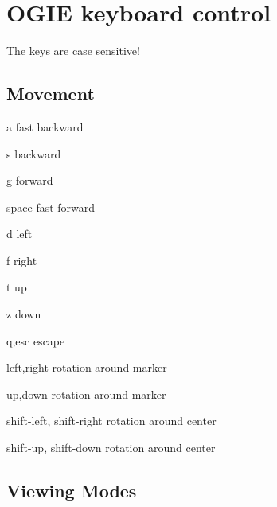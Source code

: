 

\newenvironment{keys}
    {\begin{list}{}
        {
        \setlength{\leftmargin}{9em}
        \setlength{\labelwidth}{8em}
        \setlength{\labelsep}{2em}
        \setlength{\parsep}{0em}
        \setlength{\itemsep}{0.5ex}
        }
    }
    {\end{list}}


\section{OGIE keyboard control}
\label{keys}

The keys are case sensitive!

\subsection*{Movement}

\begin{keys}
\item[a]        fast backward
\item[s]        backward
\item[g]        forward
\item[space]    fast forward
\item[d]        left
\item[f]        right
\item[t]        up
\item[z]        down
\item[q,esc]    escape
\item[left,right] rotation around marker
\item[up,down] rotation around marker
\item[shift-left, shift-right]
            rotation around center
\item[shift-up, shift-down]
            rotation around center

\end{keys}



\subsection*{Viewing Modes}

